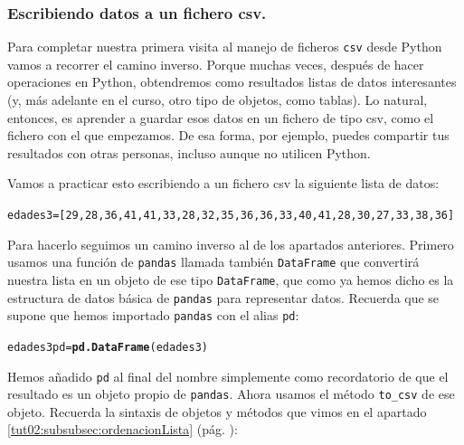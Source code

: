 \documentclass[10pt,a4paper]{article}\usepackage[]{graphicx}\usepackage[]{color}
\makeatletter
\newcommand{\hlstd}[1]{\textcolor[rgb]{0.345,0.345,0.345}{#1}}%
\newcommand{\hlkwb}[1]{\textcolor[rgb]{0.69,0.353,0.396}{#1}}%
\newcommand{\hlkwd}[1]{\textcolor[rgb]{0.737,0.353,0.396}{\textbf{#1}}}%
\newenvironment{kframe}{%
 \def\at@end@of@kframe{}%
 \ifinner\ifhmode%
  \def\at@end@of@kframe{\end{minipage}}%
  \begin{minipage}{\columnwidth}%
 \fi\fi%
 \def\FrameCommand##1{\hskip\@totalleftmargin \hskip-\fboxsep
 \colorbox{shadecolor}{##1}\hskip-\fboxsep
     \hskip-\linewidth \hskip-\@totalleftmargin \hskip\columnwidth}%
 \MakeFramed {\advance\hsize-\width
   \@totalleftmargin\z@ \linewidth\hsize
   \@setminipage}}%
 {\par\unskip\endMakeFramed%
 \at@end@of@kframe}
\newenvironment{knitrout}{}{} %
\makeatother
\begin{document}
\subsubsection*{Escribiendo datos a un fichero csv.}
\label{Tut02:subsubsec:escribiendoDatosFicheroCsv}
Para completar nuestra primera visita al manejo de ficheros {\tt csv} desde Python vamos a recorrer el camino inverso. Porque muchas veces, después de hacer operaciones en Python, obtendremos como resultados listas de datos interesantes (y, más adelante en el curso, otro tipo de objetos, como tablas). Lo natural, entonces, es aprender a guardar esos datos en un fichero de tipo csv, como el fichero con el que empezamos. De esa forma, por ejemplo, puedes compartir tus resultados con otras personas, incluso aunque no utilicen Python.

Vamos a practicar esto escribiendo a un fichero csv la siguiente lista de datos:

\begin{knitrout}
\color{fgcolor}\begin{kframe}
\begin{alltt}
edades3 = [29, 28, 36, 41, 41, 33, 28, 32, 35, 36, 36, 33, 40, 41, 28, 30, 27, 33, 38, 36]
\end{alltt}
\end{kframe}
\end{knitrout}
Para hacerlo seguimos un camino inverso al de los apartados anteriores. Primero usamos una función de {\tt pandas} llamada también {\tt DataFrame} que convertirá nuestra lista en un objeto de ese tipo {\tt DataFrame}, que como ya hemos dicho es la estructura de datos básica de {\tt pandas} para representar datos. Recuerda que se supone que hemos importado {\tt pandas} con el alias {\tt pd}:
\begin{knitrout}
\color{fgcolor}\begin{kframe}
\begin{alltt}
\hlstd{edades3pd} \hlkwb{=} \hlkwd{pd.DataFrame}\hlstd{(edades3)}
\end{alltt}
\end{kframe}
\end{knitrout}
Hemos añadido {\tt pd} al final del nombre simplemente como recordatorio de que el resultado es un objeto propio de {\tt pandas}. Ahora usamos el método \verb#to_csv# de ese objeto. Recuerda la sintaxis de objetos y métodos que vimos en el apartado \ref{tut02:subsubsec:ordenacionLista} (pág. \pageref{tut02:subsubsec:ordenacionLista}):
\end{document}
